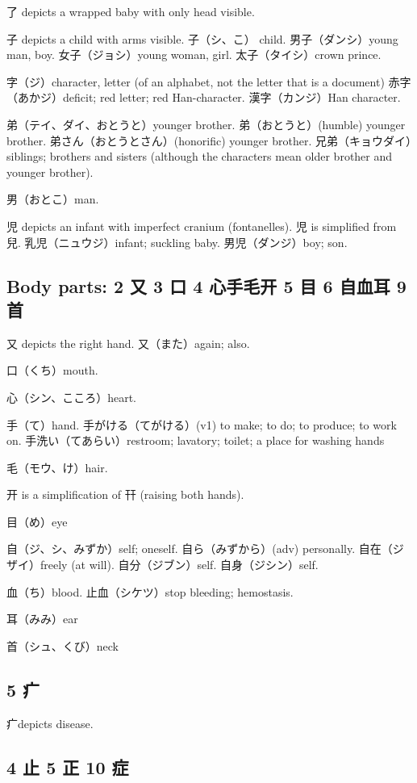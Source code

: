 了 depicts a wrapped baby with only head visible.

子 depicts a child with arms visible.
子（シ、こ） child.
男子（ダンシ）young man, boy.
女子（ジョシ）young woman, girl.
太子（タイシ）crown prince.

字（ジ）character, letter (of an alphabet, not the letter that is a document)
赤字（あかジ）deficit; red letter; red Han-character.
漢字（カンジ）Han character.

弟（テイ、ダイ、おとうと）younger brother.
弟（おとうと）(humble) younger brother.
弟さん（おとうとさん）(honorific) younger brother.
兄弟（キョウダイ）siblings;
brothers and sisters
(although the characters mean older brother and younger brother).

男（おとこ）man.

児 depicts an infant with imperfect cranium (fontanelles).
児 is simplified from 兒.
乳児（ニュウジ）infant; suckling baby.
男児（ダンジ）boy; son.

\subsection{Body parts: 2 又 3 口 4 心手毛开 5 目 6 自血耳 9 首}

又 depicts the right hand.
又（また）again; also.

口（くち）mouth.

心（シン、こころ）heart.

手（て）hand.
手がける（てがける）(v1) to make; to do; to produce; to work on.
手洗い（てあらい）restroom; lavatory; toilet; a place for washing hands

毛（モウ、け）hair.

开 is a simplification of 幵 (raising both hands).

目（め）eye

自（ジ、シ、みずか）self; oneself.
自ら（みずから）(adv) personally.
自在（ジザイ）freely (at will).
自分（ジブン）self.
自身（ジシン）self.

血（ち）blood.
止血（シケツ）stop bleeding; hemostasis.

耳（みみ）ear

首（シュ、くび）neck

\subsection{5 疒}

疒depicts disease.

\subsection{4 止 5 正 10 症}

